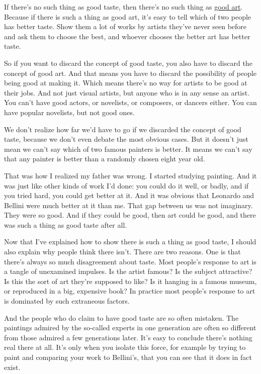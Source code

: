 \documentclass[12pt]{book}
\begin{document}
If there's no such thing as good taste, then there's no such thing as
\href{goodart.html}{good art}. Because if there is such a thing as good
art, it's easy to tell which of two people has better taste. Show them a
lot of works by artists they've never seen before and ask them to choose
the best, and whoever chooses the better art has better taste.

So if you want to discard the concept of good taste, you also have to
discard the concept of good art. And that means you have to discard the
possibility of people being good at making it. Which means there's no
way for artists to be good at their jobs. And not just visual artists,
but anyone who is in any sense an artist. You can't have good actors, or
novelists, or composers, or dancers either. You can have popular
novelists, but not good ones.

We don't realize how far we'd have to go if we discarded the concept of
good taste, because we don't even debate the most obvious cases. But it
doesn't just mean we can't say which of two famous painters is better.
It means we can't say that any painter is better than a randomly chosen
eight year old.

That was how I realized my father was wrong. I started studying
painting. And it was just like other kinds of work I'd done: you could
do it well, or badly, and if you tried hard, you could get better at it.
And it was obvious that Leonardo and Bellini were much better at it than
me. That gap between us was not imaginary. They were so good. And if
they could be good, then art could be good, and there was such a thing
as good taste after all.

Now that I've explained how to show there is such a thing as good taste,
I should also explain why people think there isn't. There are two
reasons. One is that there's always so much disagreement about taste.
Most people's response to art is a tangle of unexamined impulses. Is the
artist famous? Is the subject attractive? Is this the sort of art
they're supposed to like? Is it hanging in a famous museum, or
reproduced in a big, expensive book? In practice most people's response
to art is dominated by such extraneous factors.

And the people who do claim to have good taste are so often mistaken.
The paintings admired by the so-called experts in one generation are
often so different from those admired a few generations later. It's easy
to conclude there's nothing real there at all. It's only when you
isolate this force, for example by trying to paint and comparing your
work to Bellini's, that you can see that it does in fact exist.
\end{document}
